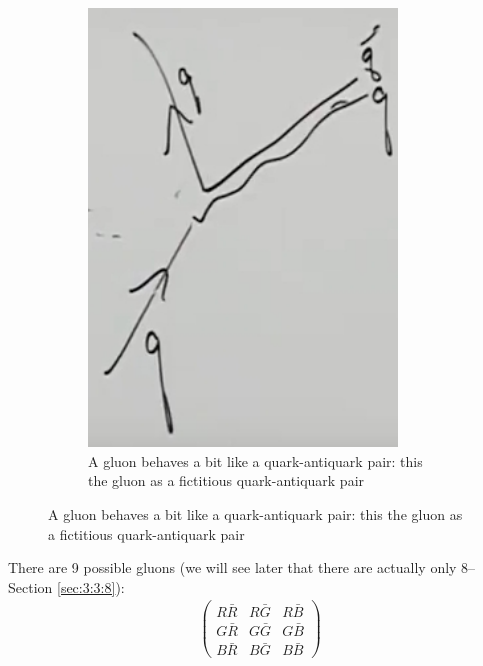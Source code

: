 \documentclass[]{article}
\begin{document}
\begin{figure}[H]
\begin{subfigure}{0.45\textwidth}
		\caption{A gluon behaves a bit like a quark-antiquark pair: this the gluon as a fictitious quark-antiquark pair}
		\includegraphics[width=0.9\textwidth]{2-2-gluon2}
	\end{subfigure}

\end{figure}

There are 9 possible gluons (we will see later that there are actually only 8--Section \ref{sec:3:3:8}):
\begin{align*}
\begin{pmatrix}
R\bar{R}&R\bar{G}&R\bar{B}\\
G\bar{R}&G\bar{G}&G\bar{B}\\
B\bar{R}&B\bar{G}&B\bar{B}
\end{pmatrix}
\end{align*}
\end{document}
